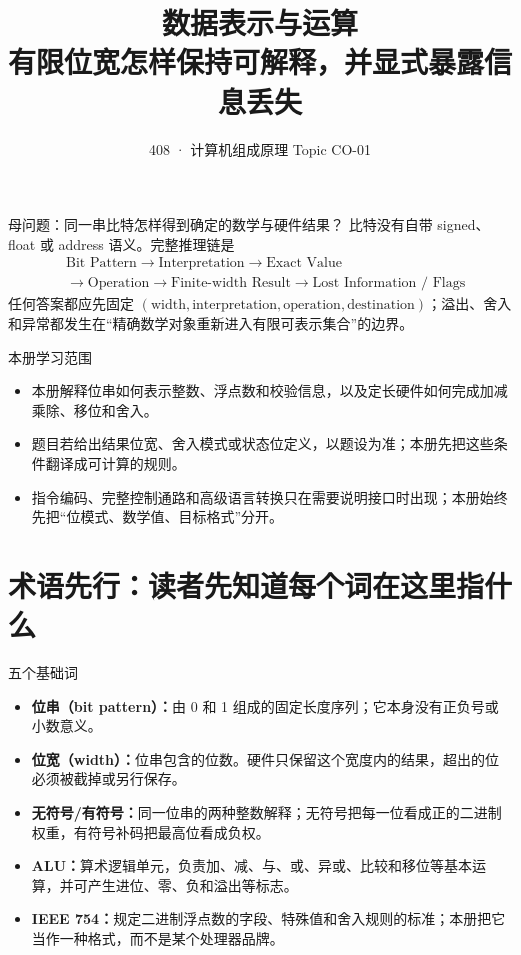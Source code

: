 \documentclass[UTF8,fontset=fandol,11pt,a4paper]{ctexart}
\title{\vspace{-1.1cm}\textbf{数据表示与运算}\\[0.4em]\large 有限位宽怎样保持可解释，并显式暴露信息丢失}
\author{408 · 计算机组成原理 Topic CO-01}
\date{}
\newcommand{\kw}[1]{\textbf{\color{deep}#1}}
\begin{document}
\maketitle

\begin{corebox}{母问题：同一串比特怎样得到确定的数学与硬件结果？}
比特没有自带 signed、float 或 address 语义。完整推理链是
\[
\begin{aligned}
&\text{Bit Pattern}\to\text{Interpretation}\to\text{Exact Value}\\
&\to\text{Operation}\to\text{Finite-width Result}\to\text{Lost Information / Flags}
\end{aligned}
\]
任何答案都应先固定 $(\text{width},\text{interpretation},\text{operation},\text{destination})$；溢出、舍入和异常都发生在“精确数学对象重新进入有限可表示集合”的边界。
\end{corebox}

\begin{methodbox}{本册学习范围}
\begin{itemize}
\item 本册解释位串如何表示整数、浮点数和校验信息，以及定长硬件如何完成加减乘除、移位和舍入。
\item 题目若给出结果位宽、舍入模式或状态位定义，以题设为准；本册先把这些条件翻译成可计算的规则。
\item 指令编码、完整控制通路和高级语言转换只在需要说明接口时出现；本册始终先把“位模式、数学值、目标格式”分开。
\end{itemize}
\end{methodbox}

\section{术语先行：读者先知道每个词在这里指什么}
\begin{methodbox}{五个基础词}
\begin{itemize}
\item \kw{位串（bit pattern）：}由 0 和 1 组成的固定长度序列；它本身没有正负号或小数意义。
\item \kw{位宽（width）：}位串包含的位数。硬件只保留这个宽度内的结果，超出的位必须被截掉或另行保存。
\item \kw{无符号/有符号：}同一位串的两种整数解释；无符号把每一位看成正的二进制权重，有符号补码把最高位看成负权。
\item \kw{ALU：}算术逻辑单元，负责加、减、与、或、异或、比较和移位等基本运算，并可产生进位、零、负和溢出等标志。
\item \kw{IEEE 754：}规定二进制浮点数的字段、特殊值和舍入规则的标准；本册把它当作一种格式，而不是某个处理器品牌。
\end{itemize}
\end{methodbox}
\end{document}

